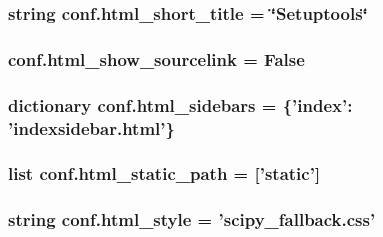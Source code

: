 \subsubsection[{html\+\_\+short\+\_\+title}]{\setlength{\rightskip}{0pt plus 5cm}string conf.\+html\+\_\+short\+\_\+title = \char`\"{}Setuptools\char`\"{}}\label{namespaceconf_ad2add41c6043d1066cc180e8d57cc4da}
\hypertarget{namespaceconf_addae8074fd85797596fa005bfa0a51a6}{}
\subsubsection[{html\+\_\+show\+\_\+sourcelink}]{\setlength{\rightskip}{0pt plus 5cm}conf.\+html\+\_\+show\+\_\+sourcelink = {\bf False}}\label{namespaceconf_addae8074fd85797596fa005bfa0a51a6}
\hypertarget{namespaceconf_a851a997495677617858e78bff00d6c6e}{}
\subsubsection[{html\+\_\+sidebars}]{\setlength{\rightskip}{0pt plus 5cm}dictionary conf.\+html\+\_\+sidebars = \{'index'\+: 'indexsidebar.\+html'\}}\label{namespaceconf_a851a997495677617858e78bff00d6c6e}
\hypertarget{namespaceconf_acb91fefcfd3aa6f3529fa682ab834832}{}
\subsubsection[{html\+\_\+static\+\_\+path}]{\setlength{\rightskip}{0pt plus 5cm}list conf.\+html\+\_\+static\+\_\+path = \mbox{[}'static'\mbox{]}}\label{namespaceconf_acb91fefcfd3aa6f3529fa682ab834832}
\hypertarget{namespaceconf_a5622a8722272baed29b41d8771ecbe3c}{}
\subsubsection[{html\+\_\+style}]{\setlength{\rightskip}{0pt plus 5cm}string conf.\+html\+\_\+style = 'scipy\+\_\+fallback.\+css'}\label{namespaceconf_a5622a8722272baed29b41d8771ecbe3c}
\hypertarget{namespaceconf_a7f1b143ff25817758abd21a7db110510}{}
